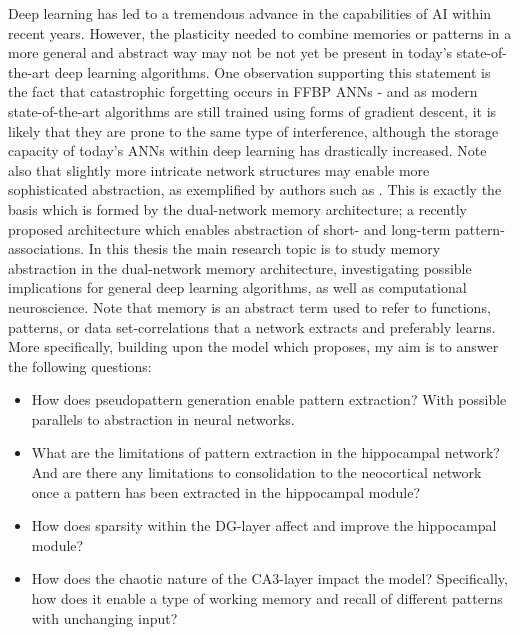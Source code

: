 Deep learning has led to a tremendous advance in the capabilities of AI within recent years. However, the plasticity needed to combine memories or patterns in a more general and abstract way may not be not yet be present in today's state-of-the-art deep learning algorithms. One observation supporting this statement is the fact that catastrophic forgetting occurs in FFBP ANNs - and as modern state-of-the-art algorithms are still trained using forms of gradient descent, it is likely that they are prone to the same type of interference, although the storage capacity of today's ANNs within deep learning has drastically increased. 
Note also that slightly more intricate network structures may enable more sophisticated abstraction, as exemplified by authors such as \cite{Tani2014}. This is exactly the basis which is formed by the dual-network memory architecture; a recently proposed architecture which enables abstraction of short- and long-term pattern-associations.
In this thesis the main research topic is to study memory abstraction in the dual-network memory architecture, investigating possible implications for general deep learning algorithms, as well as computational neuroscience. Note that memory is an abstract term used to refer to functions, patterns, or data set-correlations that a network extracts and preferably learns. More specifically, building upon the model which \cite{Hattori2014} proposes, my aim is to answer the following questions:
\begin{itemize}
\item How does pseudopattern generation enable pattern extraction? With possible parallels to abstraction in neural networks.
\item What are the limitations of pattern extraction in the hippocampal network? And are there any limitations to consolidation to the neocortical network once a pattern has been extracted in the hippocampal module?
\item How does sparsity within the DG-layer affect and improve the hippocampal module?
\item How does the chaotic nature of the CA3-layer impact the model? Specifically, how does it enable a type of working memory and recall of different patterns with unchanging input?
\end{itemize}

